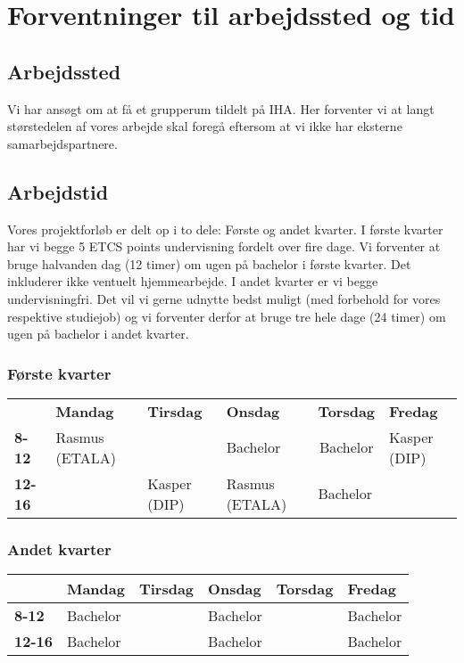 \chapter{Forventninger til arbejdssted og tid}
\section{Arbejdssted}
Vi har ansøgt om at få et grupperum tildelt på IHA. Her forventer vi at langt størstedelen af vores arbejde skal foregå eftersom at vi ikke har eksterne samarbejdspartnere.

\section{Arbejdstid}
Vores projektforløb er  delt op i to dele: Første og andet kvarter. I første kvarter har vi begge 5 ETCS points undervisning fordelt over fire dage. Vi forventer at bruge halvanden dag (12 timer) om ugen på bachelor i første kvarter. Det inkluderer ikke ventuelt hjemmearbejde. I andet kvarter er vi begge undervisningfri. Det vil vi gerne udnytte bedst muligt (med forbehold for vores respektive studiejob) og vi forventer derfor at bruge tre hele dage (24 timer) om ugen på bachelor i andet kvarter.

\subsection{Første kvarter}
\begin{table}[h]
\begin{tabular}{llllll}
               & \textbf{Mandag} & \textbf{Tirsdag} & \textbf{Onsdag} & \textbf{Torsdag}             & \textbf{Fredag} \\
\textbf{8-12}  & Rasmus (ETALA)  &                  & Bachelor        & \multicolumn{1}{c}{Bachelor} & Kasper (DIP)    \\
\textbf{12-16} &                 & Kasper (DIP)     & Rasmus (ETALA)  & Bachelor                     &                
\end{tabular}
\end{table}

\subsection{Andet kvarter}
\begin{table}[h]
\begin{tabular}{|l|l|l|l|l|l|}
\hline
               & \textbf{Mandag} & \textbf{Tirsdag} & \textbf{Onsdag} & \textbf{Torsdag}       & \textbf{Fredag} \\ \hline
\textbf{8-12}  & Bachelor        &                  & Bachelor        &  					   & Bachelor        \\ \hline
\textbf{12-16} & Bachelor        &                  & Bachelor        &                        & Bachelor        \\ \hline
\end{tabular}
\end{table}
